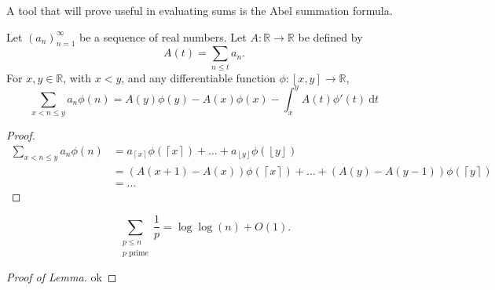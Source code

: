 \documentclass[12pt]{amsart}
\begin{document}
A tool that will prove useful in evaluating sums is the Abel summation formula.

\begin{lemma*}
Let \(\left( a_{n}  \right) _{n = 1} ^{\infty }\) be a sequence of real numbers. Let \(A: \mathbb{R} \to \mathbb{R} \) be defined by
\[
    A(t) = \sum _{n \leq t} a_{n} 
.\]
For \(x,y \in \mathbb{R} \), with \(x < y\), and any differentiable function \(\phi : [x,y] \to \mathbb{R} \),
\[
    \sum _{x < n \leq y} a_{n} \phi(n) = A(y)\phi(y) - A(x) \phi(x) - \int_{x}^{y} A(t)\phi'(t) ~\mathrm{d} t
\]
\end{lemma*}

\begin{proof}
\begin{align*}
    \sum _{x < n \leq y} a_{n} \phi(n) & = a_{\left\lceil x \right\rceil } \phi(\left\lceil x \right\rceil ) + \dots  + a_{\left\lfloor y \right\rfloor } \phi(\left\lfloor y \right\rfloor )\\
    & = \left( A(x + 1) - A(x) \right) \phi(\left\lceil x \right\rceil ) + \dots + \left( A(y) - A(y-1) \right) \phi(\left\lceil y \right\rceil ) \\
    & = \dots 
\end{align*}
\end{proof}






\begin{lemma*}
\[
    \sum _{\substack{ p \leq n \\ p\text{ prime}  }} \frac{1}{p}  = \log\log \left( n \right) + O(1)
.\]
\end{lemma*}

\begin{proof}[Proof of Lemma]
ok
\end{proof}
\end{document}
